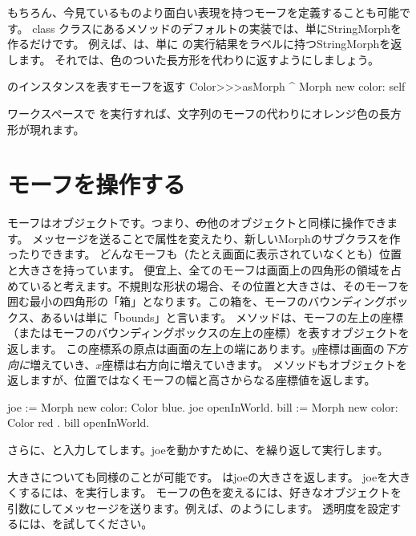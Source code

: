 \documentclass[a4paper,10pt,twoside]{book}
\begin{document}
もちろん、今見ているものより面白い表現を持つモーフを定義することも可能です。
class クラスにあるメソッドのデフォルトの実装では、単にStringMorphを作るだけです。
例えば、は、単に の実行結果をラベルに持つStringMorphを返します。
それでは、色のついた長方形を代わりに返すようにしましょう。

\begin{method}{のインスタンスを表すモーフを返す}
Color>>>asMorph
	^ Morph new color: self
\end{method}
\noindent
ワークスペースで を実行すれば、文字列のモーフの代わりにオレンジ色の長方形が現れます。


\section{モーフを操作する}

モーフはオブジェクトです。つまり、\st の他のオブジェクトと同様に操作できます。
メッセージを送ることで属性を変えたり、新しいMorphのサブクラスを作ったりできます。
どんなモーフも（たとえ画面に表示されていなくとも）位置と大きさを持っています。
便宜上、全てのモーフは画面上の四角形の領域を占めていると考えます。不規則な形状の場合、その位置と大きさは、そのモーフを囲む最小の四角形の「箱」となります。この箱を、モーフのバウンディングボックス、あるいは単に「bounds」と言います。
メソッドは、モーフの左上の座標（またはモーフのバウンディングボックスの左上の座標）を表すオブジェクトを返します。
この座標系の原点は画面の左上の端にあります。$y$座標は画面の\emph{下方向に}増えていき、$x$座標は右方向に増えていきます。
メソッドもオブジェクトを返しますが、位置ではなくモーフの幅と高さからなる座標値を返します。

\begin{code}{}
joe := Morph new color: Color blue.
joe openInWorld.
bill := Morph new color: Color red .
bill openInWorld.
\end{code}
\noindent
さらに、と入力してします。joeを動かすために、を繰り返して実行します。

大きさについても同様のことが可能です。
 はjoeの大きさを返します。
joeを大きくするには、を実行します。
モーフの色を変えるには、好きなオブジェクトを引数にしてメッセージを送ります。例えば、のようにします。
透明度を設定するには、を試してください。
\end{document}
